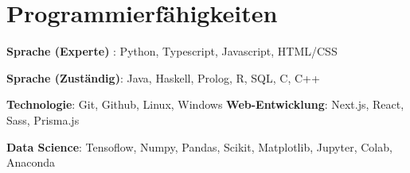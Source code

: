 \section{Programmierfähigkeiten}
\resumeSubHeadingListStart
\item{
            \textbf{Sprache (Experte) }{: Python, Typescript, Javascript, HTML/CSS}
      }
\item{
            \textbf{Sprache (Zuständig)}{: Java, Haskell, Prolog, R, SQL, C, C++}
      }
\item{
            \textbf{Technologie}{: Git, Github, Linux, Windows}
            \hfill
            \textbf{Web-Entwicklung}{: Next.js, React, Sass, Prisma.js}
      }
\item{
            \textbf{Data Science}{: Tensoflow, Numpy, Pandas, Scikit, Matplotlib, Jupyter, Colab, Anaconda}
            \hfill
      }
\resumeSubHeadingListEnd
